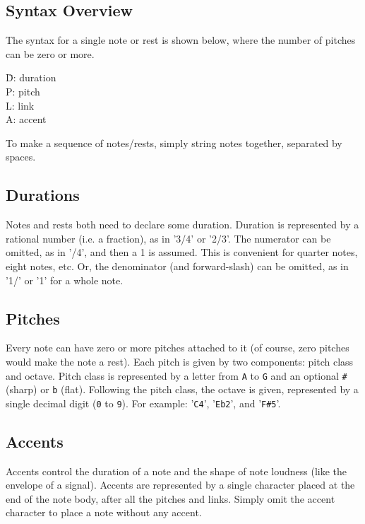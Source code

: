 \documentclass{scrartcl}
\begin{document}
\subsection{Syntax Overview}
The syntax for a single note or rest is shown below, where the number of pitches can be zero or more.
\begin{center}
   
\end{center}
\begin{tabbing}
  \hspace{1.85in}\= D: duration \\
  \> P: pitch \\
  \> L: link \\
  \> A: accent \\
\end{tabbing}
To make a sequence of notes/rests, simply string notes together, separated by spaces.

\subsection{Durations}
Notes and rests both need to declare some duration. Duration is represented by a rational number (i.e. a fraction), as in '3/4' or '2/3'. The numerator can be omitted, as in '/4', and then a 1 is assumed. This is convenient for quarter notes, eight notes, etc. Or, the denominator (and forward-slash) can be omitted, as in '1/' or '1' for a whole note.

\subsection{Pitches}
Every note can have zero or more pitches attached to it (of course, zero pitches would make the note a rest). Each pitch is given by two components: pitch class and octave. Pitch class is represented by a letter from \verb|A| to \verb|G| and an optional \verb|#| (sharp) or \verb|b| (flat). Following the pitch class, the octave is given, represented by a single decimal digit (\verb|0| to \verb|9|). For example: '\verb|C4|', '\verb|Eb2|', and '\verb|F#5|'.

\subsection{Accents}
Accents control the duration of a note and the shape of note loudness (like the envelope of a signal). Accents are represented by a single character placed at the end of the note body, after all the pitches and links. Simply omit the accent character to place a note without any accent.
\end{document}
